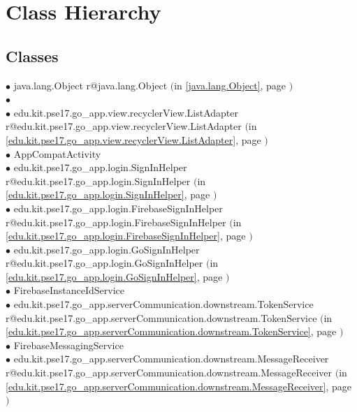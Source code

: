 \documentclass[11pt,a4paper]{article}
\makeatletter
\newcommand{\refdefined}[1]{
\expandafter\ifx\csname r@#1\endcsname\relax
\relax\else
{$($in \ref{#1}, page \pageref{#1}$)$}\fi}
\makeatother
\begin{document}
\section*{Class Hierarchy}{
\thispagestyle{empty}
\subsection*{Classes}
{\raggedright
\hspace{0.0cm} $\bullet$ java.lang.Object {\tiny \refdefined{java.lang.Object}} \\
\hspace{1.0cm} $\bullet$  {\tiny } \\
\hspace{2.0cm} $\bullet$ edu.kit.pse17.go_app.view.recyclerView.ListAdapter {\tiny \refdefined{edu.kit.pse17.go_app.view.recyclerView.ListAdapter}} \\
\hspace{1.0cm} $\bullet$ AppCompatActivity {\tiny } \\
\hspace{2.0cm} $\bullet$ edu.kit.pse17.go_app.login.SignInHelper {\tiny \refdefined{edu.kit.pse17.go_app.login.SignInHelper}} \\
\hspace{3.0cm} $\bullet$ edu.kit.pse17.go_app.login.FirebaseSignInHelper {\tiny \refdefined{edu.kit.pse17.go_app.login.FirebaseSignInHelper}} \\
\hspace{3.0cm} $\bullet$ edu.kit.pse17.go_app.login.GoSignInHelper {\tiny \refdefined{edu.kit.pse17.go_app.login.GoSignInHelper}} \\
\hspace{1.0cm} $\bullet$ FirebaseInstanceIdService {\tiny } \\
\hspace{2.0cm} $\bullet$ edu.kit.pse17.go_app.serverCommunication.downstream.TokenService {\tiny \refdefined{edu.kit.pse17.go_app.serverCommunication.downstream.TokenService}} \\
\hspace{1.0cm} $\bullet$ FirebaseMessagingService {\tiny } \\
\hspace{2.0cm} $\bullet$ edu.kit.pse17.go_app.serverCommunication.downstream.MessageReceiver {\tiny \refdefined{edu.kit.pse17.go_app.serverCommunication.downstream.MessageReceiver}} \\
}}
\end{document}
